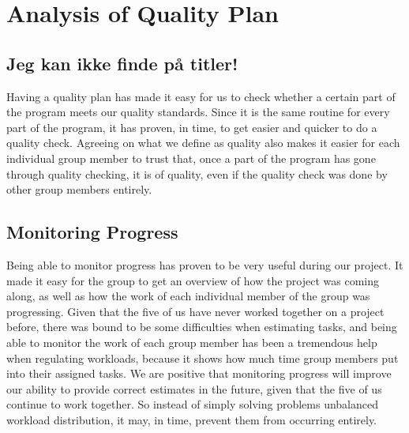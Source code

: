 \section{Analysis of Quality Plan}
\subsection{Jeg kan ikke finde på titler!}
Having a quality plan has made it easy for us to check whether a certain part of the program meets our quality standards. Since it is the same routine for every part of the program, it has proven, in time, to get easier and quicker to do a quality check. Agreeing on what we define as quality also makes it easier for each individual group member to trust that, once a part of the program has gone through quality checking, it is of quality, even if the quality check was done by other group members entirely.

\subsection{Monitoring Progress}
Being able to monitor progress has proven to be very useful during our project. It made it easy for the group to get an overview of how the project was coming along, as well as how the work of each individual member of the group was progressing. Given that the five of us have never worked together on a project before, there was bound to be some difficulties when estimating tasks, and being able to monitor the work of each group member has been a tremendous help when regulating workloads, because it shows how much time group members put into their assigned tasks.
We are positive that monitoring progress will improve our ability to provide correct estimates in the future, given that the five of us continue to work together. So instead of simply solving problems unbalanced workload distribution, it may, in time, prevent them from occurring entirely.